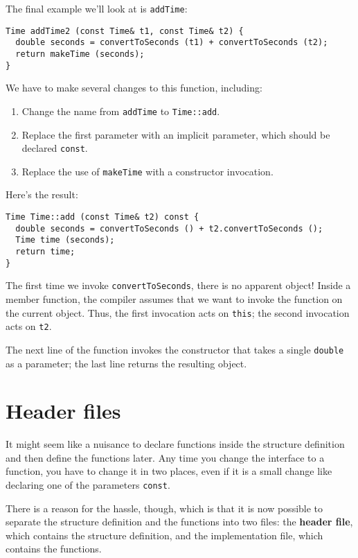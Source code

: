 The final example we'll look at is {\tt addTime}:

\begin{verbatim}
Time addTime2 (const Time& t1, const Time& t2) {
  double seconds = convertToSeconds (t1) + convertToSeconds (t2);
  return makeTime (seconds);
}
\end{verbatim}
%
We have to make several changes to this function, including:

\begin{enumerate}

\item Change the name from {\tt addTime} to {\tt Time::add}.

\item Replace the first parameter with an implicit parameter,
which should be declared {\tt const}.

\item Replace the use of {\tt makeTime} with a constructor
invocation.

\end{enumerate}
%
Here's the result:

\begin{verbatim}
Time Time::add (const Time& t2) const {
  double seconds = convertToSeconds () + t2.convertToSeconds ();
  Time time (seconds);
  return time;
}
\end{verbatim}
%
The first time we invoke {\tt convertToSeconds},
there is no apparent object!  Inside a member function, the compiler
assumes that we want to invoke the function on the current object.
Thus, the first invocation acts on {\tt this}; the second
invocation acts on {\tt t2}.

The next line of the function invokes the constructor that
takes a single {\tt double} as a parameter; the last line returns
the resulting object.

\section {Header files}

It might seem like a nuisance to declare functions inside
the structure definition and then define the functions later.
Any time you change the interface to a function, you have
to change it in two places, even if it is a small change
like declaring one of the parameters {\tt const}.

There is a reason for the hassle, though, which is that it
is now possible to separate the structure definition and the
functions into two files: the {\bf header file},
which contains the structure definition, and the implementation
file, which contains the functions.


